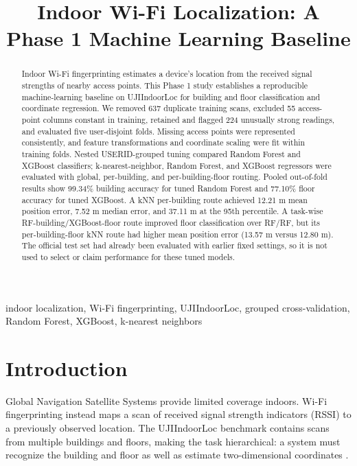 \documentclass[conference]{IEEEtran}
\title{Indoor Wi-Fi Localization: A Phase 1 Machine Learning Baseline}
\author{\IEEEauthorblockN{Kavya Jain, Naman Jain, Dhruv Ramani, Lakshya Agrawal, Akhilesh Kumar}
\IEEEauthorblockA{Project 9 -- Applied Machine Learning}}
\begin{document}
\maketitle

\begin{abstract}
Indoor Wi-Fi fingerprinting estimates a device's location from the received signal strengths of nearby access points. This Phase 1 study establishes a reproducible machine-learning baseline on UJIIndoorLoc for building and floor classification and coordinate regression. We removed 637 duplicate training scans, excluded 55 access-point columns constant in training, retained and flagged 224 unusually strong readings, and evaluated five user-disjoint folds. Missing access points were represented consistently, and feature transformations and coordinate scaling were fit within training folds. Nested USERID-grouped tuning compared Random Forest and XGBoost classifiers; k-nearest-neighbor, Random Forest, and XGBoost regressors were evaluated with global, per-building, and per-building-floor routing. Pooled out-of-fold results show 99.34\% building accuracy for tuned Random Forest and 77.10\% floor accuracy for tuned XGBoost. A kNN per-building route achieved 12.21 m mean position error, 7.52 m median error, and 37.11 m at the 95th percentile. A task-wise RF-building/XGBoost-floor route improved floor classification over RF/RF, but its per-building-floor kNN route had higher mean position error (13.57 m versus 12.80 m). The official test set had already been evaluated with earlier fixed settings, so it is not used to select or claim performance for these tuned models.
\end{abstract}
\begin{IEEEkeywords}
indoor localization, Wi-Fi fingerprinting, UJIIndoorLoc, grouped cross-validation, Random Forest, XGBoost, k-nearest neighbors
\end{IEEEkeywords}

\section{Introduction}
Global Navigation Satellite Systems provide limited coverage indoors. Wi-Fi fingerprinting instead maps a scan of received signal strength indicators (RSSI) to a previously observed location. The UJIIndoorLoc benchmark contains scans from multiple buildings and floors, making the task hierarchical: a system must recognize the building and floor as well as estimate two-dimensional coordinates \cite{uci,xia2017,liu2020}.
\end{document}
